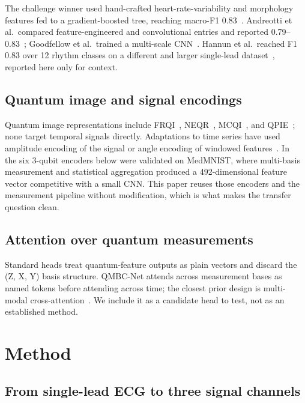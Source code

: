 \documentclass[conference,compsoc]{IEEEtran}
\begin{document}
The challenge winner used hand-crafted heart-rate-variability and morphology features fed to a gradient-boosted tree, reaching macro-F1 0.83~\cite{clifford2017af}. Andreotti et al.\ compared feature-engineered and convolutional entries and reported 0.79--0.83~\cite{andreotti2017comparing}; Goodfellow et al.\ trained a multi-scale CNN~\cite{goodfellow2018towards}. Hannun et al.\ reached F1 0.83 over 12 rhythm classes on a different and larger single-lead dataset~\cite{hannun2019cardiologist}, reported here only for context.

\subsection{Quantum image and signal encodings}

Quantum image representations include FRQI~\cite{le2011flexible}, NEQR~\cite{zhang2013neqr}, MCQI~\cite{sun2011multi}, and QPIE~\cite{yao2017quantum}; none target temporal signals directly. Adaptations to time series have used amplitude encoding of the signal or angle encoding of windowed features~\cite{kyriienko2022unsupervised}. In~\cite{atadana2026qpie} the six 3-qubit encoders below were validated on MedMNIST, where multi-basis measurement and statistical aggregation produced a 492-dimensional feature vector competitive with a small CNN. This paper reuses those encoders and the measurement pipeline without modification, which is what makes the transfer question clean.

\subsection{Attention over quantum measurements}

Standard heads treat quantum-feature outputs as plain vectors and discard the (Z, X, Y) basis structure. QMBC-Net attends across measurement bases as named tokens before attending across time; the closest prior design is multi-modal cross-attention~\cite{vaswani2017attention}. We include it as a candidate head to test, not as an established method.

\section{Method}
\label{sec:method}

\subsection{From single-lead ECG to three signal channels}
\end{document}
